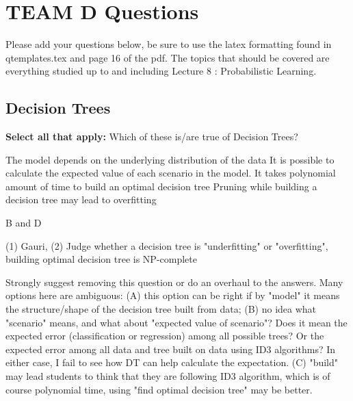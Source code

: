 \section{TEAM D Questions }

Please add your questions below, be sure to use the latex formatting found in qtemplates.tex and page 16 of the pdf. The topics that should be covered are everything studied up to and including Lecture 8 : Probabilistic Learning.

\newpage
\subsection{Decision Trees}
\begin{questions}

    \question[1] \textbf{Select all that apply:} Which of these is/are true of Decision Trees?
    {%
    \checkboxchar{$\Box$} %
    \begin{checkboxes}
     \choice The model depends on the underlying distribution of the data
     \choice It is possible to calculate the expected value of each scenario in the model.
     \choice It takes polynomial amount of time to build an optimal decision tree
     \choice Pruning while building a decision tree may lead to overfitting
    \end{checkboxes}
    }
    \begin{soln}
    B and D
    \end{soln}
    \begin{qauthor}
    (1) Gauri, (2) Judge whether a decision tree is "underfitting" or "overfitting", building optimal decision tree is NP-complete
    \end{qauthor}
    
    \begin{qtester}
    Strongly suggest removing this question or do an overhaul to the answers. Many options here are ambiguous: (A) this option can be right if by "model" it means the structure/shape of the decision tree built from data; (B) no idea what "scenario" means, and what about "expected value of scenario"? Does it mean the expected error (classification or regression) among all possible trees? Or the expected error among all data and tree built on data using ID3 algorithms? In either case, I fail to see how DT can help calculate the expectation. (C) "build" may lead students to think that they are following ID3 algorithm, which is of course polynomial time, using "find optimal decision tree" may be better.
    \end{qtester}

\end{questions}

